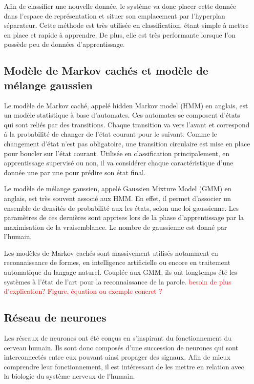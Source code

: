 Afin de classifier une nouvelle donnée, le système va donc placer cette donnée dans l'espace de représentation et situer son emplacement par l'hyperplan séparateur.
Cette méthode est très utilisée en classification, étant simple à mettre en place et rapide à apprendre. De plus, elle est très performante lorsque l'on possède peu de données d'apprentissage.

\subsection{Modèle de Markov cachés et modèle de mélange gaussien}

Le modèle de Markov caché, appelé hidden Markov model (HMM) en anglais, est un modèle statistique à base d'automates. Ces automates se composent d'états qui sont reliés par des transitions. Chaque transition va vers l'avant et correspond à la probabilité de changer de l'état courant pour le suivant. Comme le changement d'état n'est pas obligatoire, une transition circulaire est mise en place pour boucler sur l'état courant.
Utilisée en classification principalement, en apprentissage supervisé ou non, il va considérer chaque caractéristique d'une donnée une par une pour prédire son état final.

Le modèle de mélange gaussien, appelé Gaussien Mixture Model (GMM) en anglais, est très souvent associé aux HMM. En effet, il permet d'associer un ensemble de densités de probabilité aux les états, selon une loi gaussienne. Les paramètres de ces dernières sont apprises lors de la phase d'apprentissage par la maximisation de la vraisemblance. Le nombre de gaussienne est donné par l'humain.

Les modèles de Markov cachés sont massivement utilisés notamment en reconnaissance de formes, en intelligence artificielle ou encore en traitement automatique du langage naturel. Couplée aux GMM, ils ont longtemps été les systèmes à l'état de l'art pour la reconnaissance de la parole.
\textcolor{red}{besoin de plus d'explication? Figure, équation ou exemple concret ?}

\subsection{Réseau de neurones}
Les réseaux de neurones ont été conçus en s'inspirant du fonctionnement du cerveau humain. Ils sont donc composés d'une succession de neurones qui sont interconnectés entre eux pouvant ainsi propager des signaux.
Afin de mieux comprendre leur fonctionnement, il est intéressant de les mettre en relation avec la biologie du système nerveux de l'humain.

